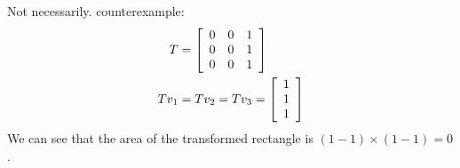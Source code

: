 \documentclass{letter}
\newcommand{\?}{\stackrel{?}{=}}
\newcommand\Ans[2][]{%
   \leavevmode\noindent
   {
       \begin{mdframed}[backgroundcolor=blue!10]
       #2
       \end{mdframed}
   }
}
\newenvironment{Mat}[1]{%
  \left[\begin{array}{*{#1}{r}}
}{%
  \end{array}\right]
}
\begin{document}
\begin{enumerate}
\begin{enumerate}[label=(\alph*)]
      \Ans{
         Not necessarily.  counterexample:
         \begin{align*}
             T    &= \begin{Mat}{3} 0 & 0 & 1 \\ 0 & 0 & 1 \\ 0 & 0 & 1 \end{Mat} \\
             Tv_1 &= Tv_2 = Tv_3 = \begin{Mat}{1} 1 \\ 1 \\ 1 \end{Mat}
         \end{align*}
         We can see that the area of the transformed rectangle is $(1-1)\times(1-1) = 0$.
      }

\end{enumerate}
\end{enumerate}
\end{document}
